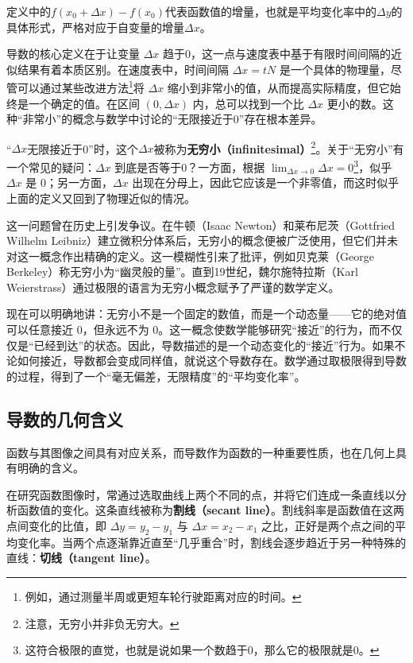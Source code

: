 定义中的$f(x_0+\Delta x)-f(x_0)$代表函数值的增量，也就是平均变化率中的$\Delta y$的具体形式，严格对应于自变量的增量$\Delta x$。

导数的核心定义在于让变量 $\Delta x$ 趋于0，这一点与速度表中基于有限时间间隔的近似结果有着本质区别。在速度表中，时间间隔 $\Delta x = tN$ 是一个具体的物理量，尽管可以通过某些改进方法\footnote{例如，通过测量半周或更短车轮行驶距离对应的时间。}将 $\Delta x$ 缩小到非常小的值，从而提高实际精度，但它始终是一个确定的值。在区间 $(0, \Delta x)$ 内，总可以找到一个比 $\Delta x$ 更小的数。这种“非常小”的概念与数学中讨论的“无限接近于0”存在根本差异。

“$\Delta x$无限接近于0”时，这个$\Delta x$被称为\textbf{无穷小（infinitesimal）}\footnote{注意，无穷小并非负无穷大。}。关于“无穷小”有一个常见的疑问：$\Delta x$ 到底是否等于0？一方面，根据 $\displaystyle\lim_{\Delta x \to 0} \Delta x = 0$\footnote{这符合极限的直觉，也就是说如果一个数趋于0，那么它的极限就是0。}，似乎 $\Delta x$ 是 0；另一方面，$\Delta x$ 出现在分母上，因此它应该是一个非零值，而这时似乎上面的定义又回到了物理近似的情况。

这一问题曾在历史上引发争议。在牛顿（Isaac Newton）和莱布尼茨（Gottfried Wilhelm Leibniz）建立微积分体系后，无穷小的概念便被广泛使用，但它们并未对这一概念作出精确的定义。这一模糊性引来了批评，例如贝克莱（George Berkeley）称无穷小为“幽灵般的量”。直到19世纪，魏尔施特拉斯（Karl Weierstrass）通过极限的语言为无穷小概念赋予了严谨的数学定义。

现在可以明确地讲：无穷小不是一个固定的数值，而是一个动态量——它的绝对值可以任意接近 0，但永远不为 0。这一概念使数学能够研究“接近”的行为，而不仅仅是“已经到达”的状态。因此，导数描述的是一个动态变化的“接近”行为。如果不论如何接近，导数都会变成同样值，就说这个导数存在。数学通过取极限得到导数的过程，得到了一个“毫无偏差，无限精度”的“平均变化率”。

\subsection{导数的几何含义}\label{sub_HsDerv_1}

函数与其图像之间具有对应关系，而导数作为函数的一种重要性质，也在几何上具有明确的含义。

在研究函数图像时，常通过选取曲线上两个不同的点，并将它们连成一条直线以分析函数值的变化。这条直线被称为\textbf{割线（secant line）}。割线斜率是函数值在这两点间变化的比值，即 $\Delta y = y_2 - y_1$ 与 $\Delta x = x_2 - x_1$ 之比，正好是两个点之间的平均变化率。当两个点逐渐靠近直至“几乎重合”时，割线会逐步趋近于另一种特殊的直线：\textbf{切线（tangent line）}。


